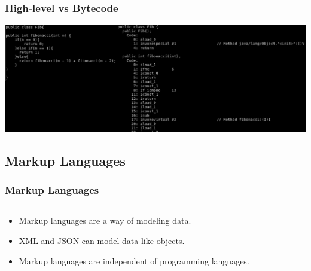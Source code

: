 \documentclass{beamer}
\begin{document}
\begin{frame}
  \frametitle{High-level vs Bytecode}
  \includegraphics[width=1\textwidth]{graphics/FibCompair.pdf}
\end{frame}

\subsection{Markup Languages}

\begin{frame}[fragile]
  \frametitle{Markup Languages}
  
  \begin{columns}
  \begin{column}{0.5\textwidth}
  \begin{itemize}
	\item Markup languages are a way of modeling data.
	\item XML and JSON can model data like objects.
	\item Markup languages are independent of programming languages.
  \end{itemize}
  \end{column}

  \begin{column}{0.5\textwidth}
  \end{column}
  \end{columns}
  
\end{frame}
\end{document}

